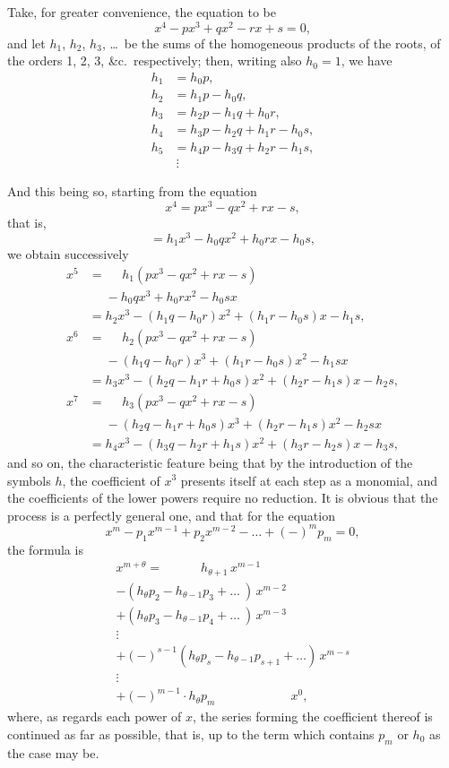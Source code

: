 \documentclass[11pt,a4paper]{article}
\theoremstyle{plain}
\theoremstyle{definition}
\theoremstyle{remark}
\begin{document}
Take, for greater convenience, the equation to be
\[
x^4 - px^3 + qx^2 - rx + s = 0,
\]
and let $h_1$, $h_2$, $h_3$, \ldots\ be the sums of the homogeneous products of the roots, of the orders 1, 2, 3, \&c.\ respectively; then, writing also $h_0 = 1$, we have
\begin{align*}
h_1 &= h_0 p, \\
h_2 &= h_1 p - h_0 q, \\
h_3 &= h_2 p - h_1 q + h_0 r, \\
h_4 &= h_3 p - h_2 q + h_1 r - h_0 s, \\
h_5 &= h_4 p - h_3 q + h_2 r - h_1 s,\\
&\ \vdots
\end{align*}

And this being so, starting from the equation
\[
x^4 = px^3 - qx^2 + rx - s,
\]
that is,
\[
= h_1 x^3 - h_0 qx^2 + h_0 rx - h_0 s,
\]
we obtain successively
\begin{align*}
x^5 &= \phantom{=} h_1(px^3 - qx^2 + rx - s) \\
&\phantom{=} {}- h_0 qx^3 + h_0 rx^2 - h_0 sx \\
&= h_2 x^3 - (h_1 q - h_0 r)x^2 + (h_1 r - h_0 s)x - h_1 s,\\[0.5em]
x^6 &= \phantom{=} h_2(px^3 - qx^2 + rx - s) \\
&\phantom{=} {}- (h_1 q - h_0 r)x^3 + (h_1 r - h_0 s)x^2 - h_1 sx \\
&= h_3 x^3 - (h_2 q - h_1 r + h_0 s)x^2 + (h_2 r - h_1 s)x - h_2 s,\\[0.5em]
x^7 &= \phantom{=} h_3(px^3 - qx^2 + rx - s) \\
&\phantom{=} {}- (h_2 q - h_1 r + h_0 s)x^3 + (h_2 r - h_1 s)x^2 - h_2 sx \\
&= h_4 x^3 - (h_3 q - h_2 r + h_1 s)x^2 + (h_3 r - h_2 s)x - h_3 s,
\end{align*}
and so on, the characteristic feature being that by the introduction of the symbols $h$, the coefficient of $x^3$ presents itself at each step as a monomial, and the coefficients of the lower powers require no reduction. It is obvious that the process is a perfectly general one, and that for the equation
\[
x^m - p_1 x^{m-1} + p_2 x^{m-2} - \ldots + (-)^m p_m = 0,
\]
the formula is
\begin{multline*}
x^{m+\theta} = \qquad\quad h_{\theta+1}\,x^{m-1} \\
- (h_\theta p_2 - h_{\theta-1} p_3 + \ldots\ )\,x^{m-2} \\
+ (h_\theta p_3 - h_{\theta-1} p_4 + \ldots\ )\,x^{m-3} \\
\vdots \\
+ (-)^{s-1}(h_\theta p_s - h_{\theta-1} p_{s+1} + \ldots)\,x^{m-s} \\
\vdots \\
+ (-)^{m-1}\cdot h_\theta p_m \qquad\qquad\qquad x^0,
\end{multline*}
where, as regards each power of $x$, the series forming the coefficient thereof is continued as far as possible, that is, up to the term which contains $p_m$ or $h_0$ as the case may be.
\end{document}
